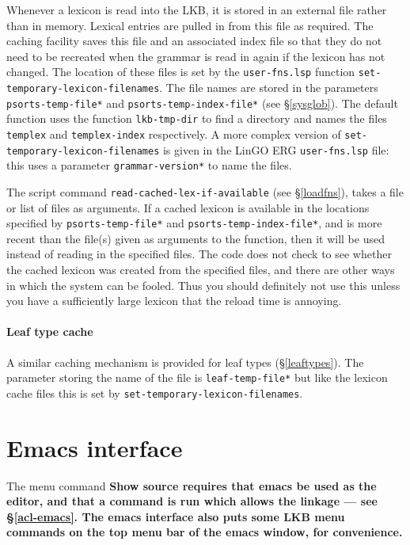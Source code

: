 \documentclass[12pt]{report}
\newcommand{\filename}[1]{{\tt #1}}
\newcommand{\functionname}[1]{{\tt #1}}
\newcommand{\lkbparam}[1]{{\tt #1}}
\newcommand{\lkbmenucommand}{\bf}
\begin{document}
Whenever a lexicon is read into the LKB, it is stored in an external file
rather than in memory.  Lexical entries are pulled in from this file as
required.  The caching facility saves this file and an associated index file
so that
they do not need to be recreated when the grammar is read in again if the
lexicon has not changed.  
The location of these files is set by the \filename{user-fns.lsp} 
function
\functionname{set-temporary-lexicon-filenames}.  The file names are
stored in the parameters \lkbparam{*psorts-temp-file*}
and \lkbparam{*psorts-temp-index-file*} (see \S\ref{sysglob}).
The default function uses the function \functionname{lkb-tmp-dir}
to find a directory and names the files \filename{templex} and 
\filename{templex-index} respectively.  A more complex version of
\functionname{set-temporary-lexicon-filenames} is given in
the LinGO ERG \filename{user-fns.lsp} file: this uses a 
parameter \lkbparam{*grammar-version*} to name the files.

The script command
\functionname{read-cached-lex-if-available} (see \S\ref{loadfns}), takes a file
or list of files as arguments.  If a cached lexicon is available in the
locations specified by \lkbparam{*psorts-temp-file*} and
\lkbparam{*psorts-temp-index-file*}, and is more recent than the file(s) given
as arguments to the function, then it will be used instead of reading in the
specified files.  The code does not check to see whether the cached lexicon was
created from the specified files, and there are other ways in which the system
can be fooled.  Thus you should definitely not use this unless you have a
sufficiently large lexicon that the reload time is annoying.

\paragraph{Leaf type cache}

A similar caching mechanism is provided for leaf types (\S\ref{leaftypes}).
The parameter storing the name of the file is \lkbparam{*leaf-temp-file*}
but like the lexicon cache files this is set by 
\functionname{set-temporary-lexicon-filenames}.

\section{Emacs interface}
\label{emacs}

The menu command \lkbmenucommand{Show source} requires that emacs be 
used as the editor, and that a command is run which
allows the linkage --- see \S\ref{acl-emacs}.
The emacs interface also puts some LKB menu commands on the top
menu bar of the emacs window, for convenience.
\end{document}
